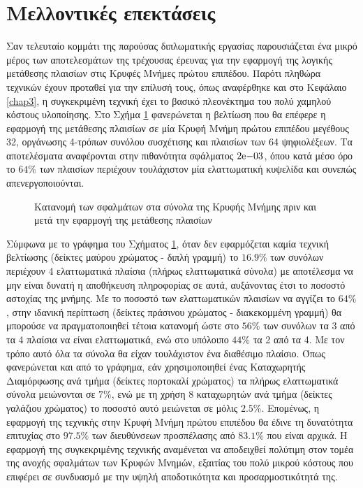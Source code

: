 
\section{Μελλοντικές επεκτάσεις}

Σαν τελευταίο κομμάτι της παρούσας διπλωματικής εργασίας παρουσιάζεται ένα μικρό μέρος των αποτελεσμάτων της τρέχουσας έρευνας για την εφαρμογή της λογικής μετάθεσης πλαισίων στις Κρυφές Μνήμες πρώτου επιπέδου. Παρότι πληθώρα τεχνικών έχουν προταθεί για την επίλυσή τους, όπως αναφέρθηκε και στο Κεφάλαιο \ref{chap3}, η συγκεκριμένη τεχνική έχει το βασικό πλεονέκτημα του πολύ χαμηλού κόστους υλοποίησης. Στο Σχήμα \ref{fig:chap8_cache_faults} φανερώνεται η βελτίωση που θα επέφερε η εφαρμογή της μετάθεσης πλαισίων σε μία Κρυφή Μνήμη πρώτου επιπέδου μεγέθους 32, οργάνωσης 4-τρόπων συνόλου συσχέτισης και πλαισίων των 64 ψηφιολέξεων. Τα αποτελέσματα αναφέρονται στην πιθανότητα σφάλματος $2\mathrm{e}{-03}$, όπου κατά μέσο όρο το $64\%$ των πλαισίων περιέχουν τουλάχιστον μία ελαττωματική κυψελίδα και συνεπώς απενεργοποιούνται.

\begin{figure}[h]
    \centering
    \caption{Κατανομή των σφαλμάτων στα σύνολα της Κρυφής Μνήμης πριν και μετά την εφαρμογή της μετάθεσης πλαισίων}
    \label{fig:chap8_cache_faults}
\end{figure}

Σύμφωνα με το γράφημα του Σχήματος \ref{fig:chap8_cache_faults}, όταν δεν εφαρμόζεται καμία τεχνική βελτίωσης (δείκτες μαύρου χρώματος - διπλή γραμμή) το $16.9\%$ των συνόλων περιέχουν 4 ελαττωματικά πλαίσια (πλήρως ελαττωματικά σύνολα) με αποτέλεσμα να μην είναι δυνατή η αποθήκευση πληροφορίας σε αυτά, αυξάνοντας έτσι το ποσοστό αστοχίας της μνήμης. Με το ποσοστό των ελαττωματικών πλαισίων να αγγίζει το $64\%$, στην ιδανική περίπτωση (δείκτες πράσινου χρώματος - διακεκομμένη γραμμή) θα μπορούσε να πραγματοποιηθεί τέτοια κατανομή ώστε στο $56\%$ των συνόλων τα 3 από τα 4 πλαίσια να είναι ελαττωματικά, ενώ στο υπόλοιπο $44\%$ τα 2 από τα 4. Με τον τρόπο αυτό όλα τα σύνολα θα είχαν τουλάχιστον ένα διαθέσιμο πλαίσιο. Όπως φανερώνεται και από το γράφημα, εάν χρησιμοποιηθεί ένας Καταχωρητής Διαμόρφωσης ανά τμήμα (δείκτες πορτοκαλί χρώματος) τα πλήρως ελαττωματικά σύνολα μειώνονται σε $7\%$, ενώ με τη χρήση 8 καταχωρητών ανά τμήμα (δείκτες γαλάζιου χρώματος) το ποσοστό αυτό μειώνεται σε μόλις $2.5\%$. Επομένως, η εφαρμογή της τεχνικής στην Κρυφή Μνήμη πρώτου επιπέδου θα έδινε τη δυνατότητα επιτυχίας στο $97.5\%$ των διευθύνσεων προσπέλασης από $83.1\%$ που είναι αρχικά. Η εφαρμογή της συγκεκριμένης τεχνικής αναμένεται να αποδειχθεί πολύτιμη στον τομέα της ανοχής σφαλμάτων των Κρυφών Μνημών, εξαιτίας του πολύ μικρού κόστους που επιφέρει σε συνδυασμό με την υψηλή αποδοτικότητα και προσαρμοστικότητά της.

